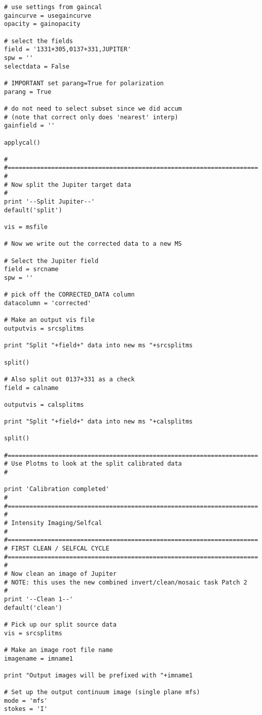 \begin{verbatim}
# use settings from gaincal
gaincurve = usegaincurve
opacity = gainopacity

# select the fields
field = '1331+305,0137+331,JUPITER'
spw = ''
selectdata = False

# IMPORTANT set parang=True for polarization
parang = True

# do not need to select subset since we did accum
# (note that correct only does 'nearest' interp)
gainfield = ''

applycal()

#
#=====================================================================
#
# Now split the Jupiter target data
#
print '--Split Jupiter--'
default('split')

vis = msfile

# Now we write out the corrected data to a new MS

# Select the Jupiter field
field = srcname
spw = ''

# pick off the CORRECTED_DATA column
datacolumn = 'corrected'

# Make an output vis file
outputvis = srcsplitms

print "Split "+field+" data into new ms "+srcsplitms

split()

# Also split out 0137+331 as a check
field = calname

outputvis = calsplitms

print "Split "+field+" data into new ms "+calsplitms

split()

#=====================================================================
# Use Plotms to look at the split calibrated data
#

print 'Calibration completed'
#
#=====================================================================
#
# Intensity Imaging/Selfcal
#
#=====================================================================
# FIRST CLEAN / SELFCAL CYCLE
#=====================================================================
#
# Now clean an image of Jupiter
# NOTE: this uses the new combined invert/clean/mosaic task Patch 2
#
print '--Clean 1--'
default('clean')

# Pick up our split source data
vis = srcsplitms

# Make an image root file name
imagename = imname1

print "Output images will be prefixed with "+imname1

# Set up the output continuum image (single plane mfs)
mode = 'mfs'
stokes = 'I'


\end{verbatim}
